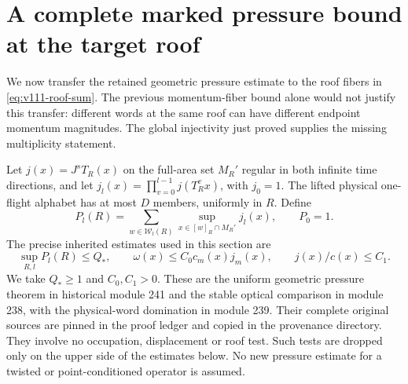 \section{A complete marked pressure bound at the target roof}
\label{sec:v111-pressure}
We now transfer the retained geometric pressure estimate to the
roof fibers in \eqref{eq:v111-roof-sum}. The previous momentum-fiber
bound alone would not justify this transfer: different words at the
same roof can have different endpoint momentum magnitudes.
The global injectivity just proved supplies the missing multiplicity
statement.

Let $j(x)=J^sT_R(x)$ on the full-area set $M_R'$ regular in both
infinite time directions, and let $j_l(x)=\prod_{v=0}^{l-1}j(T_R^vx)$,
with $j_0=1$. The lifted physical one-flight alphabet has at most
$D$ members, uniformly in $R$. Define
\[
 P_l(R)=\sum_{w\in\mathcal W_l(R)}
                      \sup_{x\in[w]_R\cap M_R'}j_l(x),\qquad P_0=1.
\]
The precise inherited estimates used in this section are
\begin{equation}\label{eq:v111-pressure-input}
 \sup_{R,l}P_l(R)\le Q_*,\qquad
 \omega(x)\le C_0c_m(x)j_m(x),\qquad
                         j(x)/c(x)\le C_1.
\end{equation}
We take $Q_*\ge1$ and $C_0,C_1>0$. These are the uniform geometric
pressure theorem in historical module 241 and the stable optical
comparison in module 238, with the physical-word domination in
module 239. Their complete original sources are pinned in the proof
ledger and copied in the provenance directory. They involve no
occupation, displacement or roof test. Such tests are dropped only
on the upper side of the estimates below. No new pressure estimate
for a twisted or point-conditioned operator is assumed.

